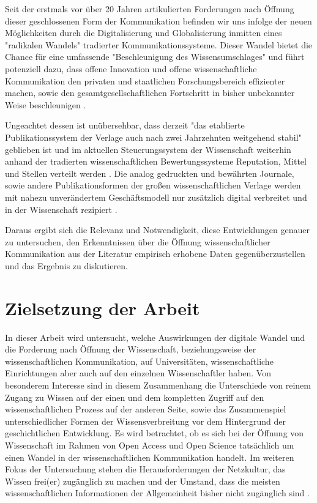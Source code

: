 Seit der erstmals vor über 20 Jahren artikulierten Forderungen nach Öffnung dieser geschlossenen Form der Kommunikation befinden wir uns infolge der neuen Möglichkeiten durch die Digitalisierung und Globalisierung \cite{mcluhan_1963_gutenberg} inmitten eines "radikalen Wandels" \cite{poynder_2011_suber} tradierter Kommunikationssysteme. Dieser Wandel bietet die Chance für eine umfassende "Beschleunigung des Wissensumschlages" \cite{Wenzel_2003} und führt potenziell dazu, dass offene Innovation und offene wissenschaftliche Kommunikation den privaten und staatlichen Forschungsbereich effizienter machen, sowie den gesamtgesellschaftlichen Fortschritt in bisher unbekannter Weise beschleunigen \cite{cite:7}.

Ungeachtet dessen ist unübersehbar, dass derzeit "das etablierte Publikationssystem der Verlage auch nach zwei Jahrzehnten weitgehend stabil" \cite{Hanekop_2014} geblieben ist und im aktuellen Steuerungssystem der Wissenschaft weiterhin anhand der tradierten wissenschaftlichen Bewertungssysteme Reputation, Mittel und Stellen verteilt werden \cite{cite:4}. Die analog gedruckten und bewährten Journale, sowie andere Publikationsformen der großen wissenschaftlichen Verlage werden mit nahezu unverändertem Geschäftsmodell nur zusätzlich digital verbreitet \cite{Hanekop_2014} \cite{boai_2012} und in der Wissenschaft rezipiert \cite{suchen}.

Daraus ergibt sich die Relevanz und Notwendigkeit, diese Entwicklungen genauer zu untersuchen, den Erkenntnissen über die Öffnung wissenschaftlicher Kommunikation aus der Literatur empirisch erhobene Daten gegenüberzustellen und das Ergebnis zu diskutieren.

\section{Zielsetzung der Arbeit}

In dieser Arbeit wird untersucht, welche Auswirkungen der digitale Wandel und die Forderung nach Öffnung der Wissenschaft, beziehungsweise der wissenschaftlichen Kommunikation, auf Universitäten, wissenschaftliche Einrichtungen aber auch auf den einzelnen Wissenschaftler haben. Von besonderem Interesse sind in diesem Zusammenhang die Unterschiede von reinem Zugang zu Wissen auf der einen und dem kompletten Zugriff auf den wissenschaftlichen Prozess auf der anderen Seite, sowie das Zusammenspiel unterschiedlicher Formen der Wissensverbreitung vor dem Hintergrund der geschichtlichen Entwicklung. Es wird betrachtet, ob es sich bei der Öffnung von Wissenschaft im Rahmen von Open Access und Open Science tatsächlich um einen Wandel in der wissenschaftlichen Kommunikation handelt. Im weiteren Fokus der Untersuchung stehen die Herausforderungen der Netzkultur, das Wissen frei(er) zugänglich zu machen und der Umstand, dass die meisten wissenschaftlichen Informationen der Allgemeinheit bisher nicht zugänglich sind \cite{cite:6}.

